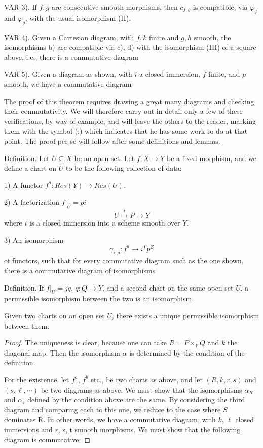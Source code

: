 \documentclass[12pt]{book}
\begin{document}
VAR 3). If \(f,g\) are consecutive smooth morphisms, then \(c_{f,g}\) is compatible, via \(\varphi_{f}\) and \(\varphi_{g}\), with the usual isomorphism (II).

VAR 4). Given a Cartesian diagram, with \(f, k\) finite and \(g,h\) smooth, the isomorphisms b) are compatible via c), d) with the isomorphism (III) of a square above, i.e., there is a commutative diagram

\setcounter{page}{321}
VAR 5). Given a diagram as shown, with \(i\) a closed immersion, \(f\) finite, and \(p\) smooth, we have a commutative diagram

The proof of this theorem requires drawing a great many diagrams and checking their commutativity. We will therefore carry out in detail only a few of these verifications, by way of example, and will leave the others to the reader, marking them with the symbol (:) which indicates that he has some work to do at that point. The proof per se will follow after some definitions and lemmas.

Definition. Let \(U \subseteq X\) be an open set. Let \(f: X \to Y\) be a fixed morphism, and we define a chart on \(U\) to be the following collection of data:

\setcounter{page}{322}
1) A functor \(f^{a}: Res(Y) \to Res(U)\).

2) A factorization \(f|_{U}=p i\)
\[U \stackrel{i}{\to} P \to Y\]
where \(i\) is a closed immersion into a scheme smooth over \(Y\).

3) An isomorphism
\[\gamma_{i,p}: f^{a} \to i^{Y} p^{Z}\]
of functors, such that for every commutative diagram such as the one shown, there is a commutative diagram of isomorphisms

Definition. If \(f|_{U}=j q\), \(q: Q \to Y\), and a second chart on the same open set \(U\), a permissible isomorphism between the two is an isomorphism

\setcounter{page}{323}
\begin{lemma}
Given two charts on an open set \(U\), there exists a unique permissible isomorphism between them.
\end{lemma}

\begin{proof}
The uniqueness is clear, because one can take \(R=P \times_{Y} Q\) and \(k\) the diagonal map. Then the isomorphism \(\alpha\) is determined by the condition of the definition.

For the existence, let \(f^{a}\), \(f^{b}\) etc., be two charts as above, and let \((R, k, r, s)\) and \((s, \ell, \cdots)\) be two diagrams as above. We must show that the isomorphisms \(\alpha_{R}\) and \(\alpha_{s}\) defined by the condition above are the same. By considering the third diagram and comparing each to this one, we reduce to the case where \(S\) dominates R. In other words, we have a commutative diagram, with \(k\), \(\ell\) closed immersions and \(r\), s, t smooth morphisms. We must show that the following diagram is commutative:

\setcounter{page}{324}
\end{proof}
\end{document}
